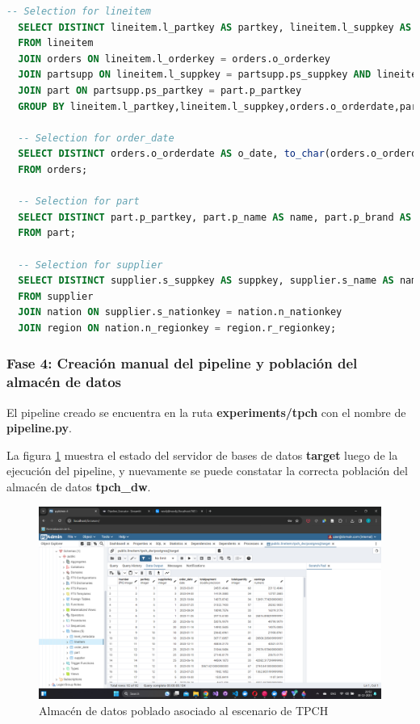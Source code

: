 \begin{lstlisting}[label={selectexp2}, caption={Consultas de selecci\'on generadas para el experimento 2}, language={sql}]
  -- Selection for lineitem
  SELECT DISTINCT lineitem.l_partkey AS partkey, lineitem.l_suppkey AS supplierkey, orders.o_orderdate AS order_date, SUM(lineitem.l_payment) AS totalpayment, SUM(lineitem.l_quantity) AS totalquantity, SUM(lineitem.l_payment)-(SUM(lineitem.l_quantity)*partsupp.ps_supplycost)-(SUM(lineitem.l_quantity)*part.p_retailprice) AS earnings
  FROM lineitem
  JOIN orders ON lineitem.l_orderkey = orders.o_orderkey
  JOIN partsupp ON lineitem.l_suppkey = partsupp.ps_suppkey AND lineitem.l_partkey = partsupp.ps_partkey
  JOIN part ON partsupp.ps_partkey = part.p_partkey
  GROUP BY lineitem.l_partkey,lineitem.l_suppkey,orders.o_orderdate,partsupp.ps_supplycost,part.p_retailprice;

  -- Selection for order_date
  SELECT DISTINCT orders.o_orderdate AS o_date, to_char(orders.o_orderdate, 'Day') AS day, to_char(orders.o_orderdate, 'Month') AS month
  FROM orders;

  -- Selection for part 
  SELECT DISTINCT part.p_partkey, part.p_name AS name, part.p_brand AS brand, part.p_size, part.p_retailprice
  FROM part;

  -- Selection for supplier 
  SELECT DISTINCT supplier.s_suppkey AS suppkey, supplier.s_name AS name, supplier.s_phone AS phone, supplier.s_address AS address, nation.n_name AS nation, region.r_name AS region
  FROM supplier
  JOIN nation ON supplier.s_nationkey = nation.n_nationkey
  JOIN region ON nation.n_regionkey = region.r_regionkey;
\end{lstlisting}

\subsubsection{Fase 4: Creaci\'on manual del pipeline y poblaci\'on del almac\'en de datos}

El pipeline creado se encuentra en la ruta \textbf{experiments/tpch} con el nombre de 
\textbf{pipeline.py}. 

La figura \ref{fig:fullpg2} muestra el estado del servidor de bases de datos \textbf{target} luego de la ejecuci\'on 
del pipeline, y nuevamente se puede constatar la correcta poblaci\'on del almac\'en de datos \textbf{tpch\_dw}.

\begin{figure}
  \centering
  \includegraphics[scale=0.4]{Graphics/fullpgadmin2.png}
  \caption{Almacén de datos poblado asociado al escenario de TPCH}
  \label{fig:fullpg2}
\end{figure}


